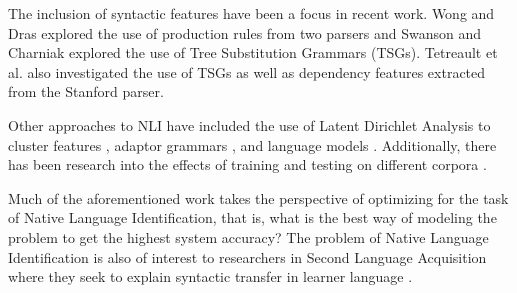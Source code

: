 \documentclass[11pt,letterpaper]{article}
\begin{document}
The inclusion of syntactic features have been a focus in recent work.
Wong and Dras  explored the use of production rules
from two parsers and Swanson and Charniak  explored
the use of Tree Substitution Grammars (TSGs).  Tetreault et al.  also investigated the use of TSGs as well as dependency
features extracted from the Stanford parser.

Other approaches to NLI have included the use of Latent Dirichlet Analysis
to cluster features \cite{Sze-MengJojoWongMarkDrasMarkJohnson:2011:ALTA2011},
adaptor grammars \cite{wong-dras-johnson:2012:EMNLP-CoNLL}, and
language models \cite{tetreault-EtAl:2012:PAPERS}.  Additionally, there has
been research into the effects of training and testing on different
corpora \cite{brooke2011native}.


Much of the aforementioned work takes the perspective of optimizing for the
task of Native Language Identification, that is, what is the best way of
modeling the problem to get the highest system accuracy?  The problem
of Native Language Identification is also of interest to researchers in
Second Language Acquisition where they seek to explain syntactic transfer
in learner language \cite{jarvis2012approaching}.
\end{document}
